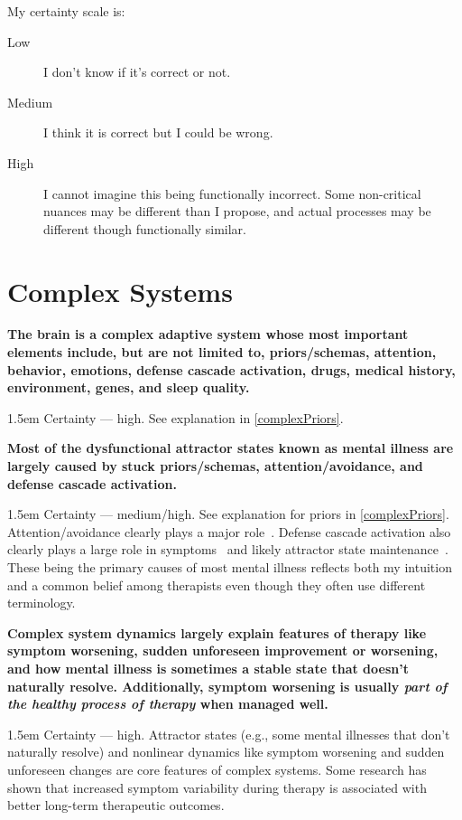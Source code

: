 \documentclass[11pt,oneside]{book}
\let\cite\parencite
\newcommand{\claim}[2]{%
    \par\medskip\noindent\textbf{#1}%
    \begin{adjustwidth}{1.5em}{}%
    \setlength{\parindent}{0pt}%
    \setlength{\parskip}{0.5\baselineskip}%
    #2%
    \end{adjustwidth}%
}
\begin{document}
My certainty scale is:
\begin{description}
    \item[Low] I don't know if it's correct or not.
    \item[Medium] I think it is correct but I could be wrong.
    \item[High] I cannot imagine this being functionally incorrect. Some non-critical nuances may be different than I propose, and actual processes may be different though functionally similar.
\end{description}

\section*{Complex Systems}
\claim{The brain is a complex adaptive system whose most important elements include, but are not limited to, priors/schemas, attention, behavior, emotions, defense cascade activation, drugs, medical history, environment, genes, and sleep quality.}{Certainty --- high. See explanation in \cref{complexPriors}.}
\claim{Most of the dysfunctional attractor states known as mental illness are largely caused by stuck priors/schemas, attention/avoidance, and defense cascade activation. }{Certainty --- medium/high. See explanation for priors in \cref{complexPriors}. Attention/avoidance clearly plays a major role~\cite{berghBSTS}. Defense cascade activation also clearly plays a large role in symptoms~\cite{kozlowskaDefenseCascade} and likely attractor state maintenance~\cite{laniusNeurobiology}. These being the primary causes of most mental illness reflects both my intuition and a common belief among therapists even though they often use different terminology.}
\claim{Complex system dynamics largely explain features of therapy like symptom worsening, sudden unforeseen improvement or worsening, and how mental illness is sometimes a stable state that doesn't naturally resolve. Additionally, symptom worsening is usually \textit{part of the healthy process of therapy} when managed well.}{Certainty --- high. Attractor states (e.g., some mental illnesses that don't naturally resolve) and nonlinear dynamics like symptom worsening and sudden unforeseen changes are core features of complex systems. Some research has shown that increased symptom variability during therapy is associated with better long-term therapeutic outcomes.}
\end{document}
